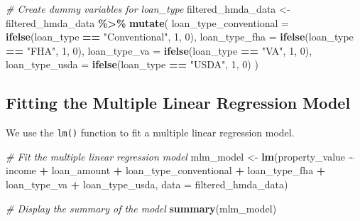 \documentclass[
]{book}
\newenvironment{Shaded}{\begin{snugshade}}{\end{snugshade}}
\newcommand{\AttributeTok}[1]{\textcolor[rgb]{0.13,0.29,0.53}{#1}}
\newcommand{\CommentTok}[1]{\textcolor[rgb]{0.56,0.35,0.01}{\textit{#1}}}
\newcommand{\DecValTok}[1]{\textcolor[rgb]{0.00,0.00,0.81}{#1}}
\newcommand{\FunctionTok}[1]{\textcolor[rgb]{0.13,0.29,0.53}{\textbf{#1}}}
\newcommand{\NormalTok}[1]{#1}
\newcommand{\OtherTok}[1]{\textcolor[rgb]{0.56,0.35,0.01}{#1}}
\newcommand{\SpecialCharTok}[1]{\textcolor[rgb]{0.81,0.36,0.00}{\textbf{#1}}}
\newcommand{\StringTok}[1]{\textcolor[rgb]{0.31,0.60,0.02}{#1}}
\begin{document}
\begin{Shaded}
\begin{Highlighting}[]
\CommentTok{\# Create dummy variables for loan\_type}
\NormalTok{filtered\_hmda\_data }\OtherTok{\textless{}{-}}\NormalTok{ filtered\_hmda\_data }\SpecialCharTok{\%\textgreater{}\%}
  \FunctionTok{mutate}\NormalTok{(}
    \AttributeTok{loan\_type\_conventional =} \FunctionTok{ifelse}\NormalTok{(loan\_type }\SpecialCharTok{==} \StringTok{"Conventional"}\NormalTok{, }\DecValTok{1}\NormalTok{, }\DecValTok{0}\NormalTok{),}
    \AttributeTok{loan\_type\_fha =} \FunctionTok{ifelse}\NormalTok{(loan\_type }\SpecialCharTok{==} \StringTok{"FHA"}\NormalTok{, }\DecValTok{1}\NormalTok{, }\DecValTok{0}\NormalTok{),}
    \AttributeTok{loan\_type\_va =} \FunctionTok{ifelse}\NormalTok{(loan\_type }\SpecialCharTok{==} \StringTok{"VA"}\NormalTok{, }\DecValTok{1}\NormalTok{, }\DecValTok{0}\NormalTok{),}
    \AttributeTok{loan\_type\_usda =} \FunctionTok{ifelse}\NormalTok{(loan\_type }\SpecialCharTok{==} \StringTok{"USDA"}\NormalTok{, }\DecValTok{1}\NormalTok{, }\DecValTok{0}\NormalTok{)}
\NormalTok{  )}
\end{Highlighting}
\end{Shaded}

\hypertarget{fitting-the-multiple-linear-regression-model}{%
\subsection{Fitting the Multiple Linear Regression Model}\label{fitting-the-multiple-linear-regression-model}}

We use the \texttt{lm()} function to fit a multiple linear regression model.

\begin{Shaded}
\begin{Highlighting}[]
\CommentTok{\# Fit the multiple linear regression model}
\NormalTok{mlm\_model }\OtherTok{\textless{}{-}} \FunctionTok{lm}\NormalTok{(property\_value }\SpecialCharTok{\textasciitilde{}}\NormalTok{ income }\SpecialCharTok{+}\NormalTok{ loan\_amount }\SpecialCharTok{+}\NormalTok{ loan\_type\_conventional }\SpecialCharTok{+}\NormalTok{ loan\_type\_fha }\SpecialCharTok{+}\NormalTok{ loan\_type\_va }\SpecialCharTok{+}\NormalTok{ loan\_type\_usda, }\AttributeTok{data =}\NormalTok{ filtered\_hmda\_data)}

\CommentTok{\# Display the summary of the model}
\FunctionTok{summary}\NormalTok{(mlm\_model)}
\end{Highlighting}
\end{Shaded}
\end{document}
